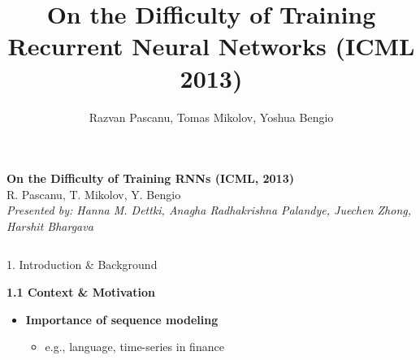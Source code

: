 \documentclass[final]{beamer}
\title{On the Difficulty of Training Recurrent Neural Networks (ICML 2013)}
\author{Razvan Pascanu, Tomas Mikolov, Yoshua Bengio}
\begin{document}
\begin{frame}[t]
\begin{center}

    {\Huge\bfseries On the Difficulty of Training RNNs (ICML, 2013)}\\[0.5em]
    {\Large R. Pascanu, T. Mikolov, Y. Bengio}\\[1em]
    {\large \textit{Presented by: Hanna M. Dettki, Anagha Radhakrishna Palandye, Juechen Zhong, Harshit Bhargava}}
  \end{center}
  

  \begin{columns}[t,totalwidth=\textwidth]

    \begin{column}{0.3\textwidth}
        \hspace{2em}
      \begin{block}{1. Introduction \& Background}

        \textbf{1.1 Context \& Motivation}
            \begin{itemize}
            \item \textbf{Importance of sequence modeling}
            \begin{itemize}
                \item e.g., language, time-series in finance
            \end{itemize}


\end{itemize}
\end{block}
\end{column}
\end{columns}
\end{frame}
\end{document}
